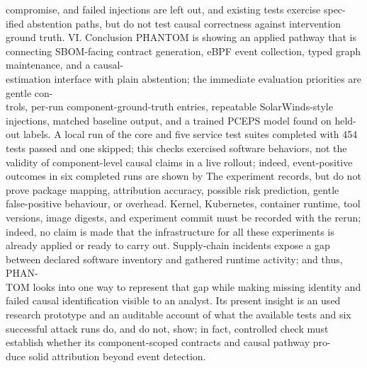 \documentclass[conference]{IEEEtran}
\begin{document}
compromise, and failed injections are left out, and existing tests exercise spec-\\ified abstention paths, but do not test causal correctness against intervention ground truth. VI. Conclusion PHANTOM is showing an applied pathway that is connecting SBOM-facing contract generation, eBPF event collection, typed graph maintenance, and a causal-\\estimation interface with plain abstention; the immediate evaluation priorities are gentle con-\\trols, per-run component-ground-truth entries, repeatable SolarWinds-style injections, matched baseline output, and a trained PCEPS model found on held-out labels. A local run of the core and five service test suites completed with 454 tests passed and one skipped; this checks exercised software behaviors, not the validity of component-level causal claims in a live rollout; indeed, event-positive outcomes in six completed runs are shown by The experiment records, but do not prove package mapping, attribution accuracy, possible risk prediction, gentle false-positive behaviour, or overhead. Kernel, Kubernetes, container runtime, tool versions, image digests, and experiment commit must be recorded with the rerun; indeed, no claim is made that the infrastructure for all these experiments is already applied or ready to carry out. Supply-chain incidents expose a gap between declared software inventory and gathered runtime activity; and thus, PHAN-\\TOM looks into one way to represent that gap while making missing identity and failed causal identification visible to an analyst. Its present insight is an used research prototype and an auditable account of what the available tests and six successful attack runs do, and do not, show; in fact, controlled check must establish whether its component-scoped contracts and causal pathway pro-\\duce solid attribution beyond event detection.
\end{document}
